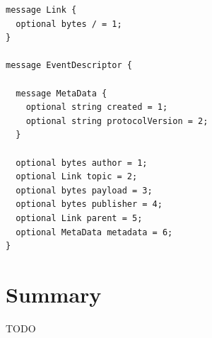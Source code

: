 \begin{lstlisting}[float, language=protobuf3,caption={Protobuf schema of the event descriptor},label={proto-event-descriptor}]
message Link {
  optional bytes / = 1;
}

message EventDescriptor {

  message MetaData {
    optional string created = 1;
    optional string protocolVersion = 2;
  }

  optional bytes author = 1;
  optional Link topic = 2;
  optional bytes payload = 3;
  optional bytes publisher = 4;
  optional Link parent = 5;
  optional MetaData metadata = 6;
}
\end{lstlisting}

\section{Summary}\label{summary}

TODO

